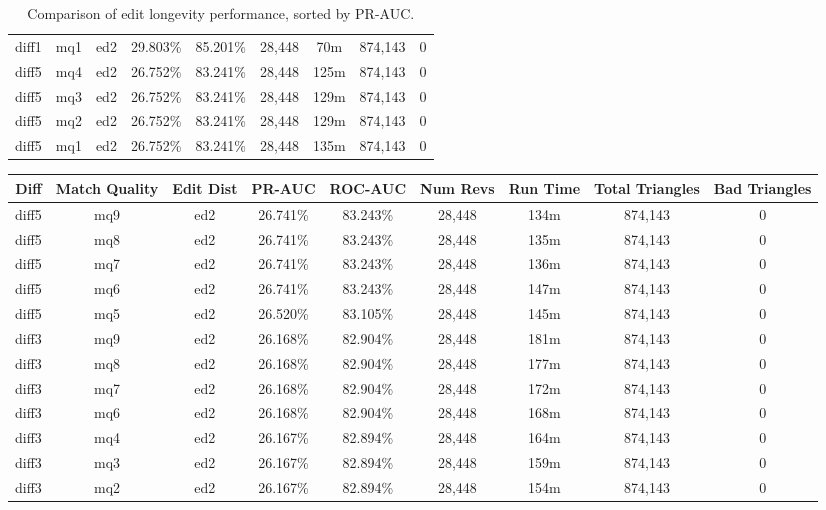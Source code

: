 \begin{sidewaystable}[!ph]
\begin{center}
\begin{tabular}{|c|c|c||c|c||c|c|c|c|}
diff1 & mq1 & ed2 & 29.803\% & 85.201\% & 28,448 & 70m & 874,143 & 0 \\
diff5 & mq4 & ed2 & 26.752\% & 83.241\% & 28,448 & 125m & 874,143 & 0 \\
diff5 & mq3 & ed2 & 26.752\% & 83.241\% & 28,448 & 129m & 874,143 & 0 \\
diff5 & mq2 & ed2 & 26.752\% & 83.241\% & 28,448 & 129m & 874,143 & 0 \\
diff5 & mq1 & ed2 & 26.752\% & 83.241\% & 28,448 & 135m & 874,143 & 0 \\
\hline
\end{tabular}
\end{center}
\caption{Comparison of edit longevity performance,
    sorted by PR-AUC.}
\label{tab:editshoutL}
\end{sidewaystable}
\clearpage
\begin{sidewaystable}[!ph]
  \begin{center}
    \begin{tabular}{|c|c|c||c|c||c|c|c|c|}
\hline
Diff & Match Quality & Edit Dist
        & PR-AUC & ROC-AUC
        & Num Revs & Run Time
        & Total Triangles & Bad Triangles \\
\hline
\hline
diff5 & mq9 & ed2 & 26.741\% & 83.243\% & 28,448 & 134m & 874,143 & 0 \\
diff5 & mq8 & ed2 & 26.741\% & 83.243\% & 28,448 & 135m & 874,143 & 0 \\
diff5 & mq7 & ed2 & 26.741\% & 83.243\% & 28,448 & 136m & 874,143 & 0 \\
diff5 & mq6 & ed2 & 26.741\% & 83.243\% & 28,448 & 147m & 874,143 & 0 \\
diff5 & mq5 & ed2 & 26.520\% & 83.105\% & 28,448 & 145m & 874,143 & 0 \\
diff3 & mq9 & ed2 & 26.168\% & 82.904\% & 28,448 & 181m & 874,143 & 0 \\
diff3 & mq8 & ed2 & 26.168\% & 82.904\% & 28,448 & 177m & 874,143 & 0 \\
diff3 & mq7 & ed2 & 26.168\% & 82.904\% & 28,448 & 172m & 874,143 & 0 \\
diff3 & mq6 & ed2 & 26.168\% & 82.904\% & 28,448 & 168m & 874,143 & 0 \\
diff3 & mq4 & ed2 & 26.167\% & 82.894\% & 28,448 & 164m & 874,143 & 0 \\
diff3 & mq3 & ed2 & 26.167\% & 82.894\% & 28,448 & 159m & 874,143 & 0 \\
diff3 & mq2 & ed2 & 26.167\% & 82.894\% & 28,448 & 154m & 874,143 & 0 \\

\end{tabular}
\end{center}
\end{sidewaystable}

